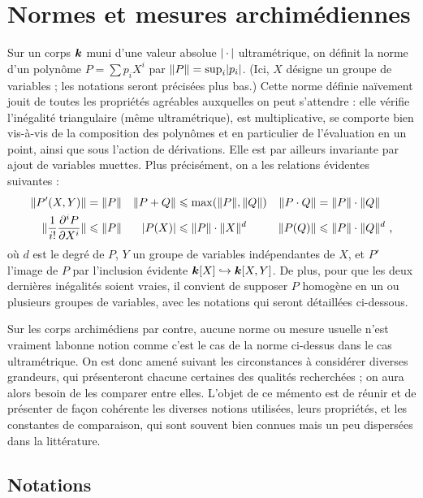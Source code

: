 
\chapter{Normes et mesures archimédiennes} \label{chap:nma}

Sur un corps ${\boldsymbol k}$ muni d'une valeur absolue $\lvert{\,\cdot\,}\rvert$ ultramétrique, on
définit la norme d'un polynôme $P = \sum p_i X^i$ par $\lVert P\rVert = \sup_i
\lvert p_i\rvert$. (Ici, $X$ désigne un groupe de variables ; les notations seront
précisées plus bas.) Cette norme définie naïvement jouit de toutes les
propriétés agréables auxquelles on peut s'attendre : elle vérifie l'inégalité
triangulaire (même ultramétrique), est multiplicative, se comporte bien
vis-à-vis de la composition des polynômes et en particulier de l'évaluation
en un point, ainsi que sous l'action de dérivations. Elle est par ailleurs
invariante par ajout de variables muettes. Plus précisément, on a les
relations évidentes suivantes :
\begin{align*}
  \lVert P'(X, Y)\rVert
  & = \lVert P\rVert
  &
  \lVert P+Q\rVert
  & \leqslant \max (\lVert P\rVert, \lVert Q\rVert)
  &
  \lVert P\cdot Q\rVert
  & = \lVert P\rVert \cdot \lVert Q\rVert
  \\
  \lVert \frac{1}{i!} \frac {\partial^i P} {\partial X^i} \rVert
  & \leqslant \lVert P\rVert
  &
  \lvert P(X)\rvert
  & \leqslant \lVert P\rVert \cdot \lVert X\rVert^d
  &
  \lVert P(Q)\rVert
  & \leqslant \lVert P\rVert \cdot \lVert Q\rVert^d
  \text{ ,}
\end{align*}
où $d$ est le degré de $P$, $Y$ un groupe de variables indépendantes de $X$,
et $P'$ l'image de $P$ par l'inclusion évidente ${\boldsymbol k}[X] \hookrightarrow
{\boldsymbol k}[X, Y]$. De plus, pour que les deux dernières inégalités soient vraies, il
convient de supposer $P$ homogène en un ou plusieurs groupes de variables,
avec les notations qui seront détaillées ci-dessous.

Sur les corps archimédiens par contre, aucune norme ou mesure usuelle n'est
vraiment \og la\fg bonne notion comme c'est le cas de la norme ci-dessus dans
le cas ultramétrique. On est donc amené suivant les circonstances à considérer
diverses grandeurs, qui présenteront chacune certaines des qualités
recherchées ; on aura alors besoin de les comparer entre elles. L'objet de ce
mémento est de réunir et de présenter de façon cohérente les diverses notions
utilisées, leurs propriétés, et les constantes de comparaison, qui sont
souvent bien connues mais un peu dispersées dans la littérature.

\section{Notations} \label{sec:nma-def}


